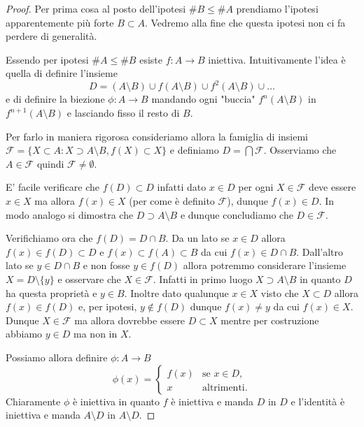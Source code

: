 \documentclass[italian,a4paper,hidelinks,headinclude]{scrartcl}
\newcommand{\F}{{\mathcal F}}
\begin{document}
\begin{proof}
Per prima cosa al posto dell'ipotesi $\# B \le \#A$ prendiamo
l'ipotesi apparentemente più forte $B\subset A$.
Vedremo alla fine che questa ipotesi non ci fa perdere di generalità.

Essendo per ipotesi $\#A \le \#B$ esiste $f\colon A \to B$ iniettiva.
Intuitivamente l'idea è quella di definire l'insieme
\[
 D = (A\setminus B)  \cup f(A\setminus B) \cup f^2(A\setminus B) \cup \dots
\]
e di definire la biezione $\phi \colon A \to B$ mandando ogni "buccia"
$f^n(A\setminus B)$ in $f^{n+1}(A\setminus B)$ e lasciando fisso
il resto di $B$.

Per farlo in maniera rigorosa
consideriamo allora la famiglia di insiemi $\F = \{X \subset A \colon X \supset A \setminus B, f(X) \subset X\}$ e definiamo $D = \bigcap \F$.
Osserviamo che $A \in \F$ quindi $\F\neq \emptyset$.

E' facile verificare che $f(D) \subset D$ infatti dato $x\in D$ per ogni $X\in \F$ deve essere $x\in X$ ma allora $f(x) \in X$ (per come è definito $\F$), dunque $f(x) \in D$. In modo analogo si dimostra che $D\supset A\setminus B$ e dunque concludiamo che $D\in \F$.

Verifichiamo ora che $f(D)=D\cap B$. Da un lato se $x\in D$ allora
$f(x) \in f(D)\subset D$ e $f(x)\subset f(A)\subset B$ da cui $f(x) \in D\cap B$.
Dall'altro lato se $y\in D \cap B$ e non fosse $y \in f(D)$
allora potremmo considerare l'insieme $X=D\setminus\{y\}$
e osservare che $X\in \F$.
Infatti in primo luogo $X \supset A \setminus B$ in quanto $D$ ha questa proprietà e $y \in B$.
Inoltre dato qualunque $x \in X$ visto che $X\subset D$ allora
$f(x) \in f(D)$ e, per ipotesi,
$y\not \in f(D)$ dunque $f(x)\neq y$ da cui $f(x) \in X$.
Dunque $X\in \F$ ma allora dovrebbe essere $D\subset X$ mentre
per costruzione abbiamo $y\in D$ ma non in $X$.


Possiamo allora definire $\phi \colon A \to B$
\[
\phi(x) =
\begin{cases}
   f(x) & \text{se $x\in D$}, \\
   x & \text{altrimenti.}
\end{cases}
\]
Chiaramente $\phi$ è iniettiva in quanto $f$ è iniettiva e manda $D$ in $D$
e l'identità è iniettiva e manda $A\setminus D$ in $A\setminus D$.


\end{proof}
\end{document}
